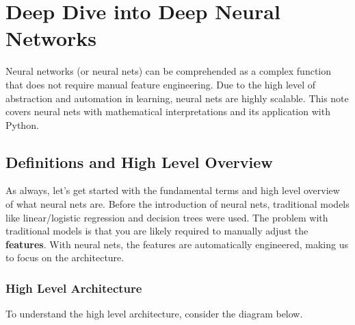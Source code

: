 \documentclass[../../../main.tex]{subfiles}
\begin{document}
\chapter{Deep Dive into Deep Neural Networks}

Neural networks (or neural nets) can be comprehended as a complex
function that does not require manual feature engineering.
Due to the high level of abstraction and automation in learning,
neural nets are highly scalable. This note covers neural nets with
mathematical interpretations and its application with Python.

\section{Definitions and High Level Overview}

As always, let's get started with the fundamental terms and high
level overview of what neural nets are. Before the introduction
of neural nets, traditional models like linear/logistic regression
and decision trees were used. The problem with traditional models
is that you are likely required to manually adjust the
\textbf{features}. With neural nets, the features are automatically
engineered, making us to focus on the architecture.

\subsection{High Level Architecture}
To understand the high level architecture, consider the diagram below.
\end{document}
